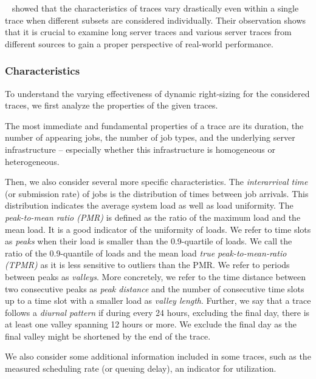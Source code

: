 \citeauthor*{Amvrosiadis2018}~\cite{Amvrosiadis2018} showed that the characteristics of traces vary drastically even within a single trace when different subsets are considered individually. Their observation shows that it is crucial to examine long server traces and various server traces from different sources to gain a proper perspective of real-world performance.

\subsubsection{Characteristics}

To understand the varying effectiveness of dynamic right-sizing for the considered traces, we first analyze the properties of the given traces.

The most immediate and fundamental properties of a trace are its duration, the number of appearing jobs, the number of job types, and the underlying server infrastructure -- especially whether this infrastructure is homogeneous or heterogeneous.

Then, we also consider several more specific characteristics. The \emph{interarrival time} (or submission rate) of jobs is the distribution of times between job arrivals. This distribution indicates the average system load as well as load uniformity. The \emph{peak-to-mean ratio (PMR)} is defined as the ratio of the maximum load and the mean load. It is a good indicator of the uniformity of loads. We refer to time slots as \emph{peaks} when their load is smaller than the 0.9-quartile of loads. We call the ratio of the 0.9-quantile of loads and the mean load \emph{true peak-to-mean-ratio (TPMR)} as it is less sensitive to outliers than the PMR. We refer to periods between peaks as \emph{valleys}. More concretely, we refer to the time distance between two consecutive peaks as \emph{peak distance} and the number of consecutive time slots up to a time slot with a smaller load as \emph{valley length}. Further, we say that a trace follows a \emph{diurnal pattern} if during every 24 hours, excluding the final day, there is at least one valley spanning 12 hours or more. We exclude the final day as the final valley might be shortened by the end of the trace.

We also consider some additional information included in some traces, such as the measured scheduling rate (or queuing delay), an indicator for utilization.

